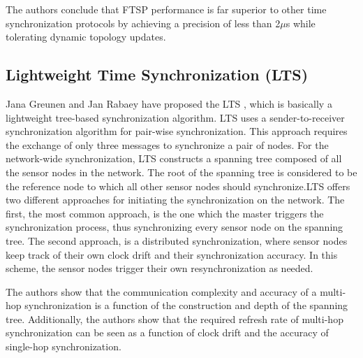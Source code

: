 The authors conclude that FTSP performance is far superior to other time synchronization protocols by achieving a precision of less than 2$\mu$s while tolerating dynamic topology updates.

\subsection{Lightweight Time Synchronization (LTS)}
Jana Greunen and Jan Rabaey have proposed the \ac{LTS} \cite{conf/wsna/GreunenR03}, which is basically a lightweight tree-based synchronization algorithm. LTS uses a sender-to-receiver synchronization algorithm for pair-wise synchronization. This approach requires the exchange of only three messages to synchronize a pair of nodes. For the network-wide synchronization, LTS constructs a spanning tree composed of all the sensor nodes in the network. The root of the spanning tree is considered to be the reference node to which all other sensor nodes should synchronize.LTS offers two different approaches for initiating the synchronization on the network. The first, the most common approach, is the one which the master triggers the synchronization process, thus synchronizing every sensor node on the spanning tree. The second approach, is a distributed synchronization, where sensor nodes keep track of their own clock drift and their synchronization accuracy. In this scheme, the sensor nodes trigger their own resynchronization as needed.

The authors show that the communication complexity and accuracy of a multi-hop synchronization is a function of the construction and depth of the spanning tree. Additionally, the authors show that the required refresh rate of multi-hop synchronization can be seen as a function of clock drift and the accuracy of single-hop synchronization.

